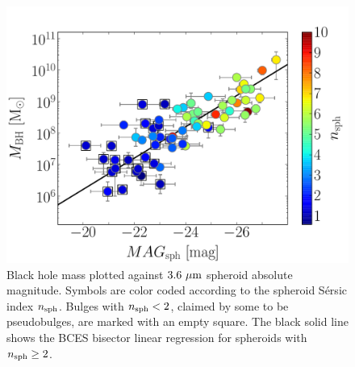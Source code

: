 \documentclass[preprint2]{emulateapj}
\begin{document}
\begin{figure}[h]
\begin{center}
\includegraphics[width=\columnwidth]{images/mbh_vs_mag_sph_psb.pdf}
\caption{Black hole mass plotted against $3.6\rm~\mu m$ spheroid absolute magnitude. 
Symbols are color coded according to the spheroid S\'ersic index $n_{\rm sph}$. 
Bulges with $n_{\rm sph}<2$, claimed by some to be pseudobulges, are marked with an empty square. 
The black solid line shows the BCES bisector linear regression for spheroids with $n_{\rm sph} \geq 2$. }
\label{fig:pseudob}
\end{center}
\end{figure}
\end{document}
